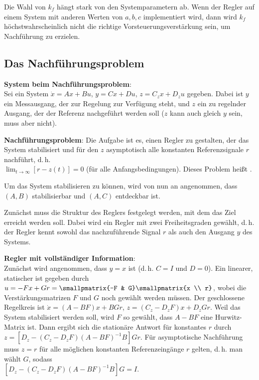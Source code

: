 Die Wahl von $k_f$ hängt stark von den Systemparametern ab.
Wenn der Regler auf einem System mit anderen Werten von $a, b, c$ implementiert wird, dann wird
$k_f$ höchstwahrscheinlich nicht die richtige Vorsteuerungsverstärkung sein, um Nachführung zu
erzielen.

\pagebreak

\subsection{%
    Das Nachführungsproblem%
}

\textbf{System beim Nachführungsproblem}:\\
Sei ein System $\dot{x} = Ax + Bu$, $y = Cx + Du$, $z = C_z x + D_z u$ gegeben.
Dabei ist $y$ ein Messausgang, der zur Regelung zur Verfügung steht, und $z$ ein zu regelnder
Ausgang, der der Referenz nachgeführt werden soll
($z$ kann auch gleich $y$ sein, muss aber nicht).

\textbf{Nachführungsproblem}:
Die Aufgabe ist es, einen Regler zu gestalten, der das System stabilisiert und für den
$z$ asymptotisch alle konstanten Referenzsignale $r$ nachführt, d.\,h.\\
$\lim_{t \to \infty} [r - z(t)] = 0$
(für alle Anfangsbedingungen).
Dieses Problem heißt .

Um das System stabilisieren zu können, wird von nun an angenommen, dass $(A, B)$ stabilisierbar
und $(A, C)$ entdeckbar ist.

Zunächst muss die Struktur des Reglers festgelegt werden, mit dem das Ziel erreicht werden soll.
Dabei wird ein Regler mit zwei Freiheitsgraden gewählt, d.\,h.
der Regler kennt sowohl das nachzuführende Signal $r$ als auch den Ausgang $y$ des Systems.

\linie

\textbf{Regler mit vollständiger Information}:\\
Zunächst wird angenommen, dass $y = x$ ist (d.\,h. $C = I$ und $D = 0$).
Ein linearer, statischer  ist gegeben durch\\
$u = -Fx + Gr = \smallpmatrix{-F & G} \smallpmatrix{x \\ r}$,
wobei die Verstärkungsmatrizen $F$ und $G$ noch gewählt werden müssen.
Der geschlossene Regelkreis ist
$\dot{x} = (A - BF)x + BGr$, $z = (C_z - D_z F)x + D_z Gr$.
Weil das System stabilisiert werden soll, wird $F$ so gewählt, dass $A - BF$ eine Hurwitz-Matrix
ist.
Dann ergibt sich die stationäre Antwort für konstantes $r$ durch\\
$z = [D_z - (C_z - D_z F)(A - BF)^{-1} B] Gr$.
Für asymptotische Nachführung muss $z = r$ für alle möglichen konstanten Referenzeingänge $r$
gelten, d.\,h. man wählt $G$, sodass\\
$[D_z - (C_z - D_z F)(A - BF)^{-1} B] G = I$.

